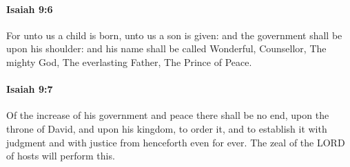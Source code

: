 		\paragraph{Isaiah 9:6} %
			\label{ISAIAH-9-6}

			For unto us a child is born, unto us a son is given: and the government shall be upon his shoulder: and his name shall be called Wonderful, Counsellor, The mighty God, The everlasting Father, The Prince of Peace.


		\paragraph{Isaiah 9:7} %
			\label{ISAIAH-9-7}

			Of the increase of his government and peace there shall be no end, upon the throne of David, and upon his kingdom, to order it, and to establish it with judgment and with justice from henceforth even for ever. The zeal of the LORD of hosts will perform this.


